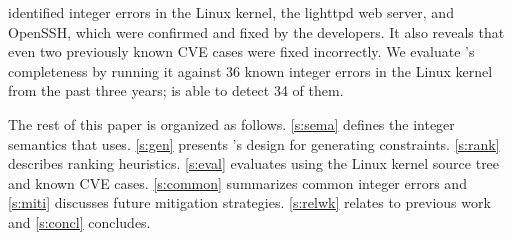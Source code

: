 \sys identified \nrbugs integer errors in the Linux kernel,
the lighttpd web server, and OpenSSH, which were confirmed and fixed
by the developers.  It also reveals that even two previously known
CVE cases were fixed incorrectly.
%
We evaluate \sys's completeness by running it against 36 known
integer errors in the Linux kernel from the past three years; \sys
is able to detect 34 of them.

The rest of this paper is organized as follows. \autoref{s:sema}
defines the integer semantics that \sys uses.  \autoref{s:gen}
presents \sys's design for generating constraints.  \autoref{s:rank}
describes ranking heuristics.  \autoref{s:eval} evaluates \sys using
the Linux kernel source tree and known CVE cases.  \autoref{s:common}
summarizes common integer errors and \autoref{s:miti} discusses
future mitigation strategies.  \autoref{s:relwk} relates \sys to previous
work and \autoref{s:concl} concludes.
